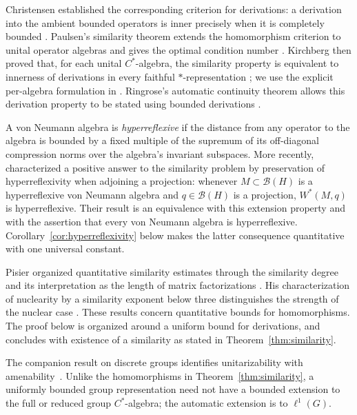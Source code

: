 Christensen established the
corresponding criterion for derivations: a derivation into the ambient
bounded operators is inner precisely when it is completely bounded
\citep{Christensen1977}.  Paulsen's similarity theorem extends the
homomorphism criterion to unital operator algebras and gives the optimal
condition number \citep[p.~226]{Paulsen1984}.  Kirchberg then proved that,
for each unital \(C^*\)-algebra, the similarity property is equivalent to
innerness of derivations in every faithful \(*\)-representation
\citep{Kirchberg1996}; we use the explicit per-algebra formulation in
\citet[Theorem~1.1]{Ozawa2006}.  Ringrose's automatic continuity theorem
allows this derivation property to be stated using bounded derivations
\citep{Ringrose1972}.

A von Neumann algebra is \emph{hyperreflexive} if the distance from
any operator to the algebra is bounded by a fixed multiple of the
supremum of its off-diagonal compression norms over the algebra's
invariant subspaces. More recently,
\citet[Theorem~2.4]{EleftherakisPaulsen2026} characterized a positive
answer to the similarity problem by preservation of hyperreflexivity
when adjoining a projection: whenever $M\subset\mathcal B(H)$ is
a hyperreflexive von Neumann algebra and $q\in\mathcal B(H)$ is a
projection, $W^*(M,q)$ is hyperreflexive. Their result is an
equivalence with this extension property and with the assertion that
every von Neumann algebra is hyperreflexive. Corollary~\ref{cor:hyperreflexivity}
below makes the latter consequence quantitative with one universal constant.

Pisier organized quantitative similarity estimates through the
similarity degree and its interpretation as the length of matrix
factorizations \citep{Pisier1999Degree,Pisier2001Remarks}.
His characterization of nuclearity by a similarity exponent below
three distinguishes the strength of the nuclear case
\citep[Theorem~1]{Pisier2006Nuclear}. These results concern quantitative
bounds for homomorphisms. The proof below is organized around a
uniform bound for derivations, and concludes with existence of a
similarity as stated in Theorem~\ref{thm:similarity}.

The companion result on discrete groups identifies unitarizability with
amenability~\cite[Theorem~1.1]{OpenAIUnitarizability2026}.
Unlike the homomorphisms in Theorem~\ref{thm:similarity}, a uniformly bounded
group representation need not have a bounded extension to the full or
reduced group $C^*$-algebra; the automatic extension is to $\ell^1(G)$.

